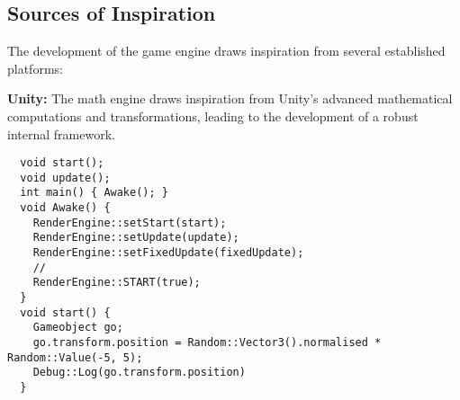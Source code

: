 



\subsection*{Sources of Inspiration}

The development of the game engine draws inspiration from several established platforms:

        \textbf{Unity:} The math engine draws inspiration from Unity's advanced mathematical computations and transformations, leading to the development of a robust internal framework.



 \begin{lstlisting}
  void start();
  void update();
  int main() { Awake(); }
  void Awake() {
    RenderEngine::setStart(start);
    RenderEngine::setUpdate(update);
    RenderEngine::setFixedUpdate(fixedUpdate);
    // 
    RenderEngine::START(true);
  }
  void start() {
    Gameobject go;
    go.transform.position = Random::Vector3().normalised *  Random::Value(-5, 5); 
    Debug::Log(go.transform.position)
  }
  \end{lstlisting}


%     


